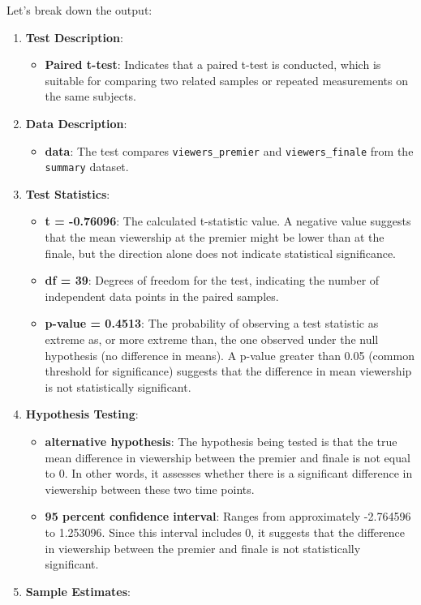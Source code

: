 \documentclass[
]{book}
\providecommand{\tightlist}{%
  \setlength{\itemsep}{0pt}\setlength{\parskip}{0pt}}
\begin{document}
Let's break down the output:

\begin{enumerate}
\def\labelenumi{\arabic{enumi}.}
\tightlist
\item
  \textbf{Test Description}:

  \begin{itemize}
  \tightlist
  \item
    \textbf{Paired t-test}: Indicates that a paired t-test is conducted, which is suitable for comparing two related samples or repeated measurements on the same subjects.
  \end{itemize}
\item
  \textbf{Data Description}:

  \begin{itemize}
  \tightlist
  \item
    \textbf{data}: The test compares \texttt{viewers\_premier} and \texttt{viewers\_finale} from the \texttt{summary} dataset.
  \end{itemize}
\item
  \textbf{Test Statistics}:

  \begin{itemize}
  \tightlist
  \item
    \textbf{t = -0.76096}: The calculated t-statistic value. A negative value suggests that the mean viewership at the premier might be lower than at the finale, but the direction alone does not indicate statistical significance.
  \item
    \textbf{df = 39}: Degrees of freedom for the test, indicating the number of independent data points in the paired samples.
  \item
    \textbf{p-value = 0.4513}: The probability of observing a test statistic as extreme as, or more extreme than, the one observed under the null hypothesis (no difference in means). A p-value greater than 0.05 (common threshold for significance) suggests that the difference in mean viewership is not statistically significant.
  \end{itemize}
\item
  \textbf{Hypothesis Testing}:

  \begin{itemize}
  \tightlist
  \item
    \textbf{alternative hypothesis}: The hypothesis being tested is that the true mean difference in viewership between the premier and finale is not equal to 0. In other words, it assesses whether there is a significant difference in viewership between these two time points.
  \item
    \textbf{95 percent confidence interval}: Ranges from approximately -2.764596 to 1.253096. Since this interval includes 0, it suggests that the difference in viewership between the premier and finale is not statistically significant.
  \end{itemize}
\item
  \textbf{Sample Estimates}:


\end{enumerate}
\end{document}
